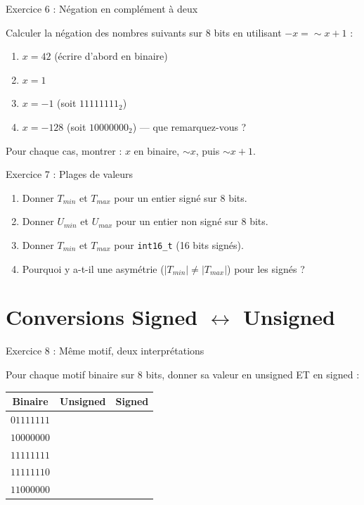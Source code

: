 \documentclass[10pt,a4paper]{article}
\begin{document}
\begin{exercicebox}{Exercice 6 : Négation en complément à deux}

Calculer la négation des nombres suivants sur 8 bits en utilisant $-x = \sim x + 1$ :

\begin{enumerate}[label=\alph*)]
    \item $x = 42$ (écrire d'abord en binaire)
    \item $x = 1$
    \item $x = -1$ (soit $11111111_2$)
    \item $x = -128$ (soit $10000000_2$) — que remarquez-vous ?
\end{enumerate}

Pour chaque cas, montrer : $x$ en binaire, $\sim x$, puis $\sim x + 1$.
\end{exercicebox}

\begin{exercicebox}{Exercice 7 : Plages de valeurs}

\begin{enumerate}[label=\alph*)]
    \item Donner $T_{min}$ et $T_{max}$ pour un entier signé sur 8 bits.
    \item Donner $U_{min}$ et $U_{max}$ pour un entier non signé sur 8 bits.
    \item Donner $T_{min}$ et $T_{max}$ pour \texttt{int16\_t} (16 bits signés).
    \item Pourquoi y a-t-il une asymétrie ($|T_{min}| \neq |T_{max}|$) pour les signés ?
\end{enumerate}
\end{exercicebox}

\section{Conversions Signed $\leftrightarrow$ Unsigned}

\begin{exercicebox}{Exercice 8 : Même motif, deux interprétations}

Pour chaque motif binaire sur 8 bits, donner sa valeur en unsigned ET en signed :

\begin{center}
\begin{tabular}{|c|c|c|}
\hline
\textbf{Binaire} & \textbf{Unsigned} & \textbf{Signed} \\
\hline
$01111111$ & & \\
\hline
$10000000$ & & \\
\hline
$11111111$ & & \\
\hline
$11111110$ & & \\
\hline
$11000000$ & & \\
\hline
\end{tabular}
\end{center}
\end{exercicebox}
\end{document}
